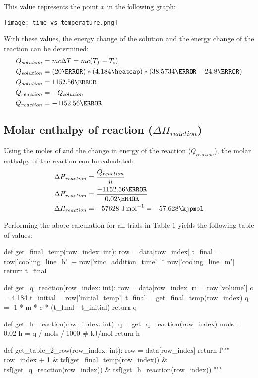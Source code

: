 \documentclass[demo, 12pt, notitlepage, letterpaper]{report}
\begin{document}
This value represents the point $x$ in the following graph:

\centerline{\noindent\texttt{[image: time-vs-temperature.png]}}

With these values, the energy change of the solution and the energy change of the reaction can be determined:
\begin{align*}
	Q_{solution} & = mc\Delta T = mc(T_f - T_i)
	\\
	Q_{solution} & = (20\gram) * (4.184\heatcap) * (38.5734\celsius - 24.8\celsius)
	\\
	Q_{solution} & = 1152.56\joule
	\\
	Q_{reaction} & = -Q_{solution}
	\\
	Q_{reaction} & = -1152.56\joule
\end{align*}

\subsection*{Molar enthalpy of reaction ($\Delta H_{reaction}$)}

Using the moles of  and the change in energy of the reaction ($Q_{reaction}$), the molar enthalpy of the reaction can be calculated:
\begin{align*}
	\Delta H_{reaction} & = \frac{Q_{reaction}}{n}                        \\
	\Delta H_{reaction} & = \frac{-1152.56\joule}{0.02\mol}               \\
	\Delta H_{reaction} & = -57628~\unit{\joule\per\mol} = -57.628\kjpmol
\end{align*}

Performing the above calculation for all trials in Table 1 yields the following table of values:

\begin{pycode}
def get_final_temp(row_index: int):
	row = data[row_index]
	t_final = row['cooling_line_b'] + row['zinc_addition_time'] * row['cooling_line_m']
	return t_final

def get_q_reaction(row_index: int):
	row = data[row_index]
	m = row['volume']
	c = 4.184
	t_initial = row['initial_temp']
	t_final = get_final_temp(row_index)
	q = -1 * m * c * (t_final - t_initial)
	return q

def get_h_reaction(row_index: int):
	q = get_q_reaction(row_index)
	mols = 0.02
	h = q / mols / 1000 # kJ/mol
	return h

def get_table_2_row(row_index: int):
	row = data[row_index]
	return f"""
		{row_index + 1}
		& {tsf(get_final_temp(row_index))}
		& {tsf(get_q_reaction(row_index))}
		& {tsf(get_h_reaction(row_index))}
	"""
\end{pycode}
\end{document}
